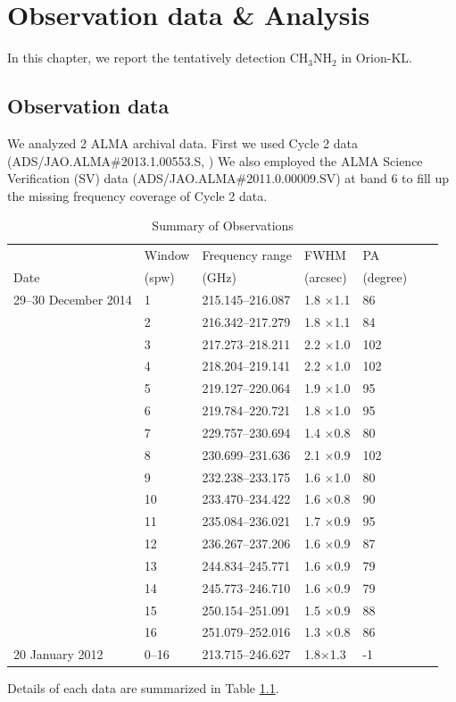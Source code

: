 \chapter{Observation data \& Analysis
\label{chap:Orion-KL}}

In this chapter, we report the tentatively detection CH$_{3}$NH$_{2}$ in Orion-KL.

\section{Observation data}
We analyzed 2 ALMA archival data. First we used Cycle 2 data (ADS/JAO.ALMA\#2013.1.00553.S, 
\cite{Pagani+2017}) 
We also employed the ALMA Science Verification (SV) data (ADS/JAO.ALMA\#2011.0.00009.SV) 
at band 6 to fill up the missing frequency coverage of Cycle 2 data. 
\renewcommand{\arraystretch}{1.5}
\begin{table}[htb]
\begin{center}
  \caption{Summary of Observations}
  \label{tab:Obs_Ori}
{\scriptsize
  \begin{tabular}{lllllll} \hline \hline
 & Window & Frequency range & FWHM & PA \\
Date & (spw)  & (GHz) & (arcsec) & (degree) \\ \hline 
29--30 December 2014&1 & 215.145--216.087 & 1.8 $\times$1.1 & 86 \\
&2 & 216.342--217.279 & 1.8 $\times$1.1 & 84 \\
&3 & 217.273--218.211 & 2.2 $\times$1.0 & 102 \\
&4 & 218.204--219.141 & 2.2 $\times$1.0 & 102 \\
&5 & 219.127--220.064 & 1.9 $\times$1.0 & 95 \\
&6 & 219.784--220.721 & 1.8 $\times$1.0  & 95 \\
&7 & 229.757--230.694 & 1.4 $\times$0.8 & 80 \\
&8 & 230.699--231.636 & 2.1 $\times$0.9 & 102 \\
&9 & 232.238--233.175 & 1.6 $\times$1.0 & 80 \\
&10 & 233.470--234.422 & 1.6 $\times$0.8 & 90 \\
&11 & 235.084--236.021 & 1.7 $\times$0.9 & 95 \\
&12 & 236.267--237.206 & 1.6 $\times$0.9 & 87 \\
&13 & 244.834--245.771 & 1.6 $\times$0.9 & 79 \\
&14 & 245.773--246.710 & 1.6 $\times$0.9 & 79 \\
&15 & 250.154--251.091 & 1.5 $\times$0.9 & 88 \\
&16 & 251.079--252.016 & 1.3 $\times$0.8 & 86 \\ \hline
20 January 2012 & 0--16 & 213.715--246.627& 1.8$\times$1.3 & -1  \\ \hline
  \end{tabular}
  }
\end{center}
\end{table}
Details of each data are summarized in Table \ref{tab:Obs_Ori}.

